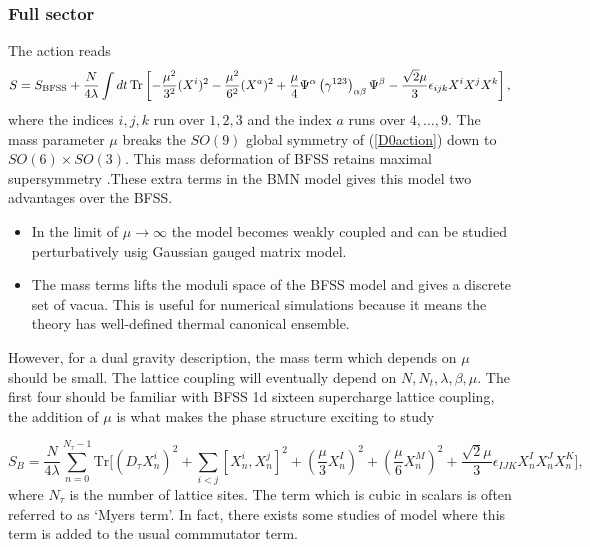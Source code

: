 \documentclass[11pt]{article}
\begin{document}
\subsubsection{Full sector}

The action reads 
\begin{equation}
	S = S_{\rm{BFSS}} + \frac{N}{4\lambda} \int dt \,\mbox{Tr} \left[
	-\frac{\mu^2}{ 3^2} ( X^i)^2
	-\frac{\mu^2}{ 6^2} (X^a)^2 +
	\frac{\mu}{4}\Psi^\alpha \left(\gamma^{123}\right)_{\alpha \beta} \Psi^\beta 
	- \frac{\sqrt{2}\mu}{3} \epsilon_{ijk} X^iX^jX^k \right] ,
	\label{PWMMaction}
\end{equation}
where the indices $i,j,k$ run over $1,2,3$ and the index $a$ runs over $4,\dots,9$.
The mass parameter $\mu$ breaks the $SO(9)$ global symmetry of (\ref{D0action}) down to $SO(6)\times SO(3)$. 
This mass deformation of BFSS retains maximal supersymmetry \cite{Berenstein:2002jq}.These extra terms in the BMN model gives this model two advantages over the BFSS. 

\begin{itemize}
	\item In the limit of $\mu\to\infty$ the model becomes weakly coupled and can be studied perturbatively usig Gaussian gauged matrix model.  
	\item The mass terms lifts the moduli space of the BFSS model and gives a discrete set of vacua. This is useful for numerical simulations because it means the theory has well-defined thermal canonical ensemble. 
\end{itemize}
However, for a dual gravity description, the mass term which depends on $\mu$ should be small. The lattice coupling will eventually depend on $N, N_{t}, \lambda, \beta, \mu$. The first four should be familiar with BFSS 1d sixteen supercharge lattice coupling, the addition of $\mu$ is what makes the phase structure exciting to study 


\begin{equation}
	S_B = \frac{N}{4\lambda} \sum_{n = 0}^{N_{\tau} - 1} \mbox{Tr} \Bigg[\left(D_{\tau} X_n^i\right)^2 + \sum_{i < j} \left[X_n^i, X_n^j\right]^2 
	+ \left(\frac{\mu}{3} X_n^I\right)^2 + \left(\frac{\mu}{6} X_n^M\right)^2
	+ \frac{\sqrt{2} \mu}{3} \epsilon_{IJK} X_n^I X_n^J X_n^K\Bigg],
\end{equation}
where $N_{\tau}$ is the number of lattice sites. The term which is cubic in scalars is often referred to as `Myers term'. In fact, there exists some studies of model where this term is added to the usual commmutator term.
\end{document}
